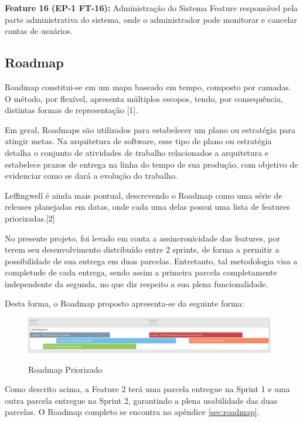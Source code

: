 \textbf{Feature 16 (EP-1 FT-16):} Administração do Sistema
Feature responsável pela parte administrativa do sistema, onde o administrador pode monitorar e cancelar contas de usuários.

\subsection{Roadmap}

Roadmap constitui-se em um mapa baseado em tempo, composto por camadas. O método, por flexível, apresenta múltiplos escopos, tendo, por consequência, distintas formas de representação [1].

Em geral, Roadmaps são utilizados para estabelecer um plano ou estratégia para atingir metas. Na arquitetura de software, esse tipo de plano ou estratégia detalha o conjunto de atividades de trabalho relacionados a arquitetura e estabelece prazos de entrega na linha do tempo de sua produção, com objetivo de evidenciar como se dará a evolução do trabalho.

Leffingwell é ainda mais pontual, descrevendo o Roadmap como uma série de releases planejadas em datas, onde cada uma delas possui uma lista de features priorizadas.[2]

No presente projeto, foi levado em conta a assincronicidade das features, por terem seu desenvolvimento distribuído entre 2 sprints, de forma a permitir a possibilidade de sua entrega em duas parcelas. Entretanto, tal metodologia visa a completude de cada entrega, sendo assim a primeira parcela completamente independente da segunda, no que diz respeito a sua plena funcionalidade.

Desta forma, o Roadmap proposto apresenta-se da seguinte forma:

\FloatBarrier
\begin{figure}[!htpd]
		\centering
		\includegraphics[scale=0.3]{figuras/roadmapPRI}
		\label{img:roadmapPRI}
		\caption{Roadmap Priorizado}
\end{figure}

Como descrito acima, a Feature 2 terá uma parcela entregue na Sprint 1 e uma outra parcela entregue na Sprint 2, garantindo a plena usabilidade das duas parcelas.
O Roadmap completo se encontra no apêndice \ref{sec:roadmap}.

